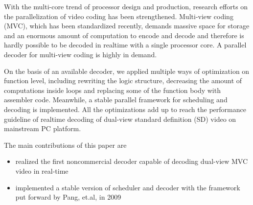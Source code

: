 \begin{eabstract} 

With the multi-core trend of processor design and production, research efforts on the parallelization of video coding has been strengthened. Multi-view coding (MVC), which has been standardized recently, demands massive space for storage and an enormous amount of computation to encode and decode and therefore is hardly possible to be decoded in realtime with a single processor core. A parallel decoder for multi-view coding is highly in demand.

On the basis of an available decoder, we applied multiple ways of optimization on function level, including rewriting the logic structure, decreasing the amount of computations inside loops and replacing some of the function body with assembler code. Meanwhile, a stable parallel framework for scheduling and decoding is implemented. All the optimizations add up to reach the performance guideline of realtime decoding of dual-view standard definition (SD) video on mainstream PC platform.

The main contributions of this paper are
\begin{itemize}
\item realized the first noncommercial decoder capable of decoding dual-view MVC video in real-time
\item implemented a stable version of scheduler and decoder with the framework\cite{pang2009framework} put forward by Pang, et.al, in 2009
\end{itemize}

\end{eabstract}


